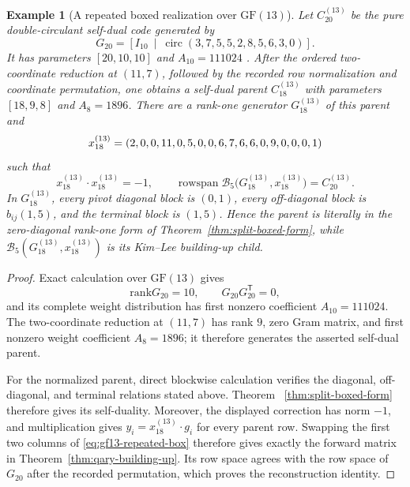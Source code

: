 \documentclass[12pt]{article}
\newtheorem{example}{Example}[section]
\newcommand{\GF}[1]{\ensuremath{\mathrm{GF}(#1)}}
\newcommand{\rank}{\mathrm{rank}}
\begin{document}
\begin{example}[A repeated boxed realization over
\texorpdfstring{\(\GF{13}\)}{GF(13)}]
\label{ex:gf13-repeated-realization}
\rm
Let \(C_{20}^{(13)}\) be the pure double-circulant self-dual code generated
by
\[
G_{20}=\left[I_{10}\ \middle|\
\operatorname{circ}(3,7,5,5,2,8,5,6,3,0)\right].
\]
It has parameters \([20,10,10]\) and \(A_{10}=111024\)
\cite{BetsumiyaEtAl}.  After the ordered two-coordinate reduction at
\((11,7)\), followed by the recorded row normalization and coordinate
permutation, one obtains a self-dual parent \(C_{18}^{(13)}\) with parameters
\([18,9,8]\) and \(A_8=1896\).  There are a rank-one generator
\(G_{18}^{(13)}\) of this parent and
\[
x_{18}^{(13)}=(2,0,0,11,0,5,0,0,6,7,6,6,0,9,0,0,0,1)
\]
such that
\[
x_{18}^{(13)}\cdot x_{18}^{(13)}=-1,\qquad
\operatorname{rowspan}\mathcal B_5
 \bigl(G_{18}^{(13)},x_{18}^{(13)}\bigr)=C_{20}^{(13)}.
\]
In \(G_{18}^{(13)}\), every pivot diagonal block is \((0,1)\), every
off-diagonal block is \(b_{ij}(1,5)\), and the terminal block is \((1,5)\).
Hence the parent is literally in the zero-diagonal rank-one form of
Theorem~\ref{thm:split-boxed-form}, while
\(\mathcal B_5(G_{18}^{(13)},x_{18}^{(13)})\) is its Kim--Lee
building-up child.
\end{example}

\begin{proof}
Exact calculation over \(\GF{13}\) gives
\[
\rank G_{20}=10,\qquad G_{20}G_{20}^{\mathsf T}=0,
\]
and its complete weight distribution has first nonzero coefficient
\(A_{10}=111024\).  The two-coordinate reduction at \((11,7)\) has rank
\(9\), zero Gram matrix, and first nonzero weight coefficient
\(A_8=1896\); it therefore generates the asserted self-dual parent.

For the normalized parent, direct blockwise calculation verifies the
diagonal, off-diagonal, and terminal relations stated above.  Theorem~
\ref{thm:split-boxed-form} therefore gives its self-duality.  Moreover,
the displayed correction has norm \(-1\), and multiplication gives
\(y_i=x_{18}^{(13)}\cdot g_i\) for every parent row.  Swapping the first two
columns of \eqref{eq:gf13-repeated-box} therefore gives exactly the forward
matrix in Theorem~\ref{thm:qary-building-up}.  Its row space agrees with the
row space of \(G_{20}\) after the recorded permutation, which proves the
reconstruction identity.
\end{proof}
\end{document}
